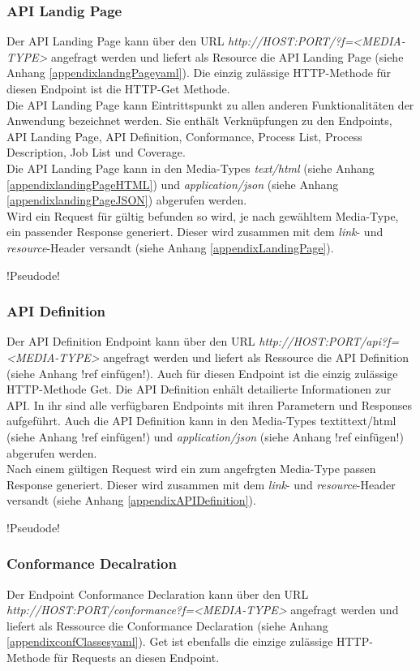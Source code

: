 \subsubsection{API Landig Page}
Der API Landing Page kann über den URL \textit{http://HOST:PORT/?f=<MEDIA-TYPE>} angefragt werden und liefert als Resource die 
API Landing Page (siehe Anhang \ref{appendixlandngPageyaml}). 
Die einzig zulässige HTTP-Methode für diesen Endpoint ist die HTTP-Get Methode.\\ 
Die API Landing Page kann Eintrittspunkt zu allen anderen Funktionalitäten der Anwendung bezeichnet werden. Sie enthält Verknüpfungen zu den Endpoints, API Landing Page, API Definition, 
Conformance, Process List, Process Description, Job List und Coverage.\\
Die API Landing Page kann in den Media-Types \textit{text/html} (siehe Anhang \ref{appendixlandingPageHTML}) und \textit{application/json} 
(siehe Anhang \ref{appendixlandingPageJSON}) abgerufen werden.\\
 
Wird ein Request für gültig befunden so wird, je nach gewähltem Media-Type, ein passender Response generiert. 
Dieser wird zusammen mit dem \textit{link}- und \textit{resource}-Header versandt (siehe Anhang \ref{appendixLandingPage}). 

!Pseudode!

\subsubsection{API Definition}
Der API Definition Endpoint kann über den URL \textit{http://HOST:PORT/api?f=<MEDIA-TYPE>} angefragt werden und liefert als Ressource die API Definition (siehe Anhang !ref einfügen!).
Auch für diesen Endpoint ist die einzig zulässige HTTP-Methode Get. 
Die API Definition enhält detailierte Informationen zur API. In ihr sind alle verfügbaren Endpoints mit ihren Parametern und Responses aufgeführt. Auch die API Definition kann in den Media-Types
textit{text/html} (siehe Anhang !ref einfügen!) und \textit{application/json} (siehe Anhang !ref einfügen!) abgerufen werden.\\
Nach einem gültigen Request wird ein zum angefrgten Media-Type passen Response generiert. Dieser wird zusammen mit dem \textit{link}- und \textit{resource}-Header versandt (siehe Anhang \ref{appendixAPIDefinition}). 

!Pseudode!
\subsubsection{Conformance Decalration}
Der Endpoint Conformance Declaration kann über den URL \textit{http://HOST:PORT/conformance?f=<MEDIA-TYPE>} angefragt werden und liefert als Ressource die Conformance Declaration (siehe Anhang \ref{appendixconfClassesyaml}).
Get ist ebenfalls die einzige zulässige HTTP-Methode für Requests an diesen Endpoint.

